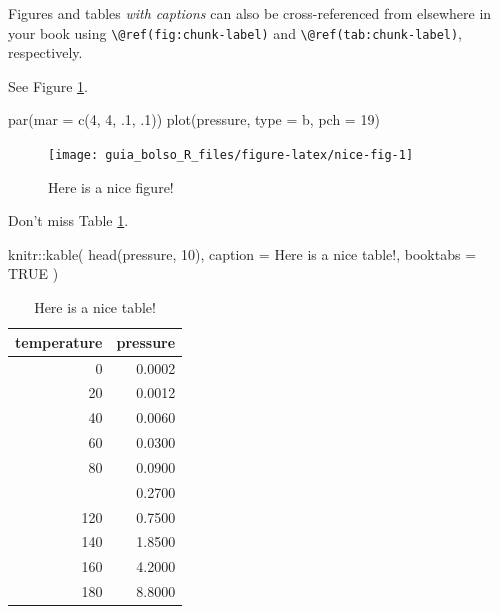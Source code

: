 \documentclass[
]{book}
\newenvironment{Shaded}{\begin{snugshade}}{\end{snugshade}}
\newcommand{\AttributeTok}[1]{\textcolor[rgb]{0.77,0.63,0.00}{#1}}
\newcommand{\ConstantTok}[1]{\textcolor[rgb]{0.00,0.00,0.00}{#1}}
\newcommand{\DecValTok}[1]{\textcolor[rgb]{0.00,0.00,0.81}{#1}}
\newcommand{\FunctionTok}[1]{\textcolor[rgb]{0.00,0.00,0.00}{#1}}
\newcommand{\NormalTok}[1]{#1}
\newcommand{\SpecialCharTok}[1]{\textcolor[rgb]{0.00,0.00,0.00}{#1}}
\newcommand{\StringTok}[1]{\textcolor[rgb]{0.31,0.60,0.02}{#1}}
\theoremstyle{definition}
\theoremstyle{definition}
\theoremstyle{definition}
\theoremstyle{definition}
\theoremstyle{remark}
\begin{document}
Figures and tables \emph{with captions} can also be cross-referenced from elsewhere in your book using \texttt{\textbackslash{}@ref(fig:chunk-label)} and \texttt{\textbackslash{}@ref(tab:chunk-label)}, respectively.

See Figure \ref{fig:nice-fig}.

\begin{Shaded}
\begin{Highlighting}[]
\FunctionTok{par}\NormalTok{(}\AttributeTok{mar =} \FunctionTok{c}\NormalTok{(}\DecValTok{4}\NormalTok{, }\DecValTok{4}\NormalTok{, .}\DecValTok{1}\NormalTok{, .}\DecValTok{1}\NormalTok{))}
\FunctionTok{plot}\NormalTok{(pressure, }\AttributeTok{type =} \StringTok{\textquotesingle{}b\textquotesingle{}}\NormalTok{, }\AttributeTok{pch =} \DecValTok{19}\NormalTok{)}
\end{Highlighting}
\end{Shaded}

\begin{figure}

{\centering \texttt{[image: guia\_bolso\_R\_files/figure-latex/nice-fig-1]} 

}

\caption{Here is a nice figure!}\label{fig:nice-fig}
\end{figure}

Don't miss Table \ref{tab:nice-tab}.

\begin{Shaded}
\begin{Highlighting}[]
\NormalTok{knitr}\SpecialCharTok{::}\FunctionTok{kable}\NormalTok{(}
  \FunctionTok{head}\NormalTok{(pressure, }\DecValTok{10}\NormalTok{), }\AttributeTok{caption =} \StringTok{\textquotesingle{}Here is a nice table!\textquotesingle{}}\NormalTok{,}
  \AttributeTok{booktabs =} \ConstantTok{TRUE}
\NormalTok{)}
\end{Highlighting}
\end{Shaded}

\begin{table}

\caption{\label{tab:nice-tab}Here is a nice table!}
\centering
\begin{tabular}[t]{rr}
\toprule
temperature & pressure\\
\midrule
0 & 0.0002\\
20 & 0.0012\\
40 & 0.0060\\
60 & 0.0300\\
80 & 0.0900\\
\addlinespace
100 & 0.2700\\
120 & 0.7500\\
140 & 1.8500\\
160 & 4.2000\\
180 & 8.8000\\
\bottomrule
\end{tabular}
\end{table}
\end{document}
